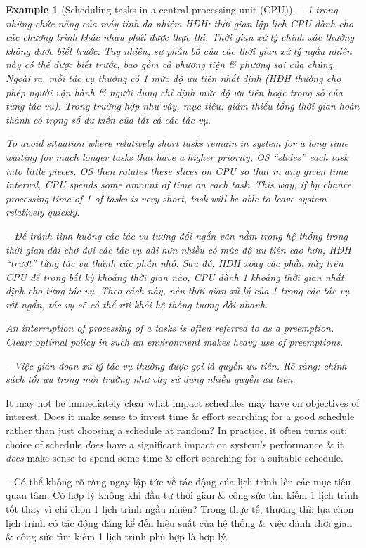 \documentclass{article}
\newtheorem{example}{Example}
\begin{document}
\begin{itemize}
\begin{itemize}
\begin{example}[Scheduling tasks in a central processing unit (CPU)]
            -- 1 trong những chức năng của máy tính đa nhiệm HĐH: thời gian lập lịch CPU dành cho các chương trình khác nhau phải được thực thi. Thời gian xử lý chính xác thường không được biết trước. Tuy nhiên, sự phân bố của các thời gian xử lý ngẫu nhiên này có thể được biết trước, bao gồm cả phương tiện \& phương sai của chúng. Ngoài ra, mỗi tác vụ thường có 1 mức độ ưu tiên nhất định (HĐH thường cho phép người vận hành \& người dùng chỉ định mức độ ưu tiên hoặc trọng số của từng tác vụ). Trong trường hợp như vậy, mục tiêu: giảm thiểu tổng thời gian hoàn thành có trọng số dự kiến của tất cả các tác vụ.

            To avoid situation where relatively short tasks remain in system for a long time waiting for much longer tasks that have a higher priority, OS ``slides'' each task into little pieces. OS then rotates these slices on CPU so that in any given time interval, CPU spends some amount of time on each task. This way, if by chance processing time of 1 of tasks is very short, task will be able to leave system relatively quickly.

            -- Để tránh tình huống các tác vụ tương đối ngắn vẫn nằm trong hệ thống trong thời gian dài chờ đợi các tác vụ dài hơn nhiều có mức độ ưu tiên cao hơn, HĐH ``trượt'' từng tác vụ thành các phần nhỏ. Sau đó, HĐH xoay các phần này trên CPU để trong bất kỳ khoảng thời gian nào, CPU dành 1 khoảng thời gian nhất định cho từng tác vụ. Theo cách này, nếu thời gian xử lý của 1 trong các tác vụ rất ngắn, tác vụ sẽ có thể rời khỏi hệ thống tương đối nhanh.

            An interruption of processing of a tasks is often referred to as a {\it preemption}. Clear: optimal policy in such an environment makes heavy use of preemptions.

            -- Việc gián đoạn xử lý tác vụ thường được gọi là quyền ưu tiên. Rõ ràng: chính sách tối ưu trong môi trường như vậy sử dụng nhiều quyền ưu tiên.
        \end{example}
        It may not be immediately clear what impact schedules may have on objectives of interest. Does it make sense to invest time \& effort searching for a good schedule rather than just choosing a schedule at random? In practice, it often turns out: choice of schedule {\it does} have a significant impact on system's performance \& it {\it does} make sense to spend some time \& effort searching for a suitable schedule.

        -- Có thể không rõ ràng ngay lập tức về tác động của lịch trình lên các mục tiêu quan tâm. Có hợp lý không khi đầu tư thời gian \& công sức tìm kiếm 1 lịch trình tốt thay vì chỉ chọn 1 lịch trình ngẫu nhiên? Trong thực tế, thường thì: lựa chọn lịch trình có tác động đáng kể đến hiệu suất của hệ thống \& việc dành thời gian \& công sức tìm kiếm 1 lịch trình phù hợp là hợp lý.


\end{itemize}
\end{itemize}
\end{document}
